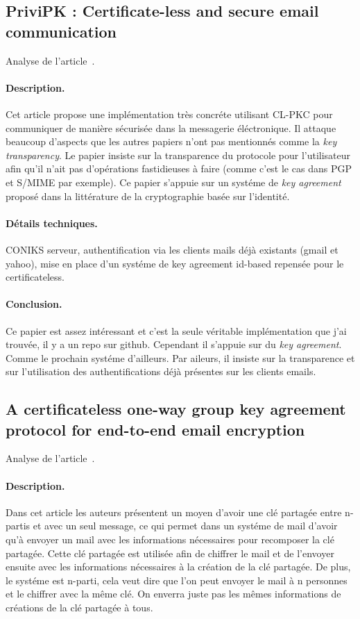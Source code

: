 \subsection{PriviPK : Certificate-less and secure email communication}
Analyse de l'article~\cite{DBLP:journals/compsec/AlSabahTLSD17}.
\paragraph*{Description.} Cet article propose une implémentation très concréte utilisant CL-PKC pour communiquer de manière sécurisée dans la messagerie éléctronique. Il attaque beaucoup d'aspects que les autres papiers n'ont pas mentionnés comme la \textit{key transparency}. Le papier insiste sur la transparence du protocole pour l'utilisateur afin qu'il n'ait pas d'opérations fastidieuses à faire (comme c'est le cas dans PGP et S/MIME par exemple). Ce papier s'appuie sur un systéme de \textit{key agreement} proposé dans la littérature de la cryptographie basée sur l'identité.
\paragraph*{Détails techniques.} CONIKS serveur, authentification via les clients mails déjà existants (gmail et yahoo), mise en place d'un systéme de key agreement id-based repensée pour le certificateless.
\paragraph*{Conclusion.} Ce papier est assez intéressant et c'est la seule véritable implémentation que j'ai trouvée, il y a un repo sur github. Cependant il s'appuie sur du \textit{key agreement}. Comme le prochain systéme d'ailleurs. Par aileurs, il insiste sur la transparence et sur l'utilisation des authentifications déjà présentes sur les clients emails.
\subsection{A certificateless one-way group key agreement protocol for end-to-end email encryption}
Analyse de l'article~\cite{DBLP:conf/prdc/YehSDSSW18}.
\paragraph*{Description.} Dans cet article les auteurs présentent un moyen d'avoir une clé partagée entre n-partis et avec un seul message, ce qui permet dans un systéme de mail d'avoir qu'à envoyer un mail avec les informations nécessaires pour recomposer la clé partagée. Cette clé partagée est utilisée afin de chiffrer le mail et de l'envoyer ensuite avec les informations nécessaires à la création de la clé partagée. De plus, le systéme est n-parti, cela veut dire que l'on peut envoyer le mail à n personnes et le chiffrer avec la même clé. On enverra juste pas les mêmes informations de créations de la clé partagée à tous.
